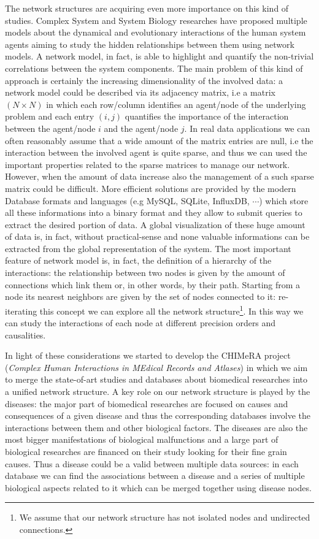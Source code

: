 \documentclass{standalone}
\begin{document}
The network structures are acquiring even more importance on this kind of studies.
Complex System and System Biology researches have proposed multiple models about the dynamical and evolutionary interactions of the human system agents aiming to study the hidden relationships between them using network models.
A network model, in fact, is able to highlight and quantify the non-trivial correlations between the system components.
The main problem of this kind of approach is certainly the increasing dimensionality of the involved data: a network model could be described via its adjacency matrix, i.e a matrix $(N\times N)$ in which each row/column identifies an agent/node of the underlying problem and each entry $(i, j)$ quantifies the importance of the interaction between the agent/node $i$ and the agent/node $j$.
In real data applications we can often reasonably assume that a wide amount of the matrix entries are null, i.e the interaction between the involved agent is quite sparse, and thus we can used the important properties related to the sparse matrices to manage our network.
However, when the amount of data increase also the management of a such sparse matrix could be difficult.
More efficient solutions are provided by the modern Database formats and languages (e.g MySQL, SQLite, InfluxDB, $\cdots$) which store all these informations into a binary format and they allow to submit queries to extract the desired portion of data.
A global visualization of these huge amount of data is, in fact, without practical-sense and none valuable informations can be extracted from the global representation of the system.
The most important feature of network model is, in fact, the definition of a hierarchy of the interactions: the relationship between two nodes is given by the amount of connections which link them or, in other words, by their path.
Starting from a node its nearest neighbors are given by the set of nodes connected to it: re-iterating this concept we can explore all the network structure\footnote{
  We assume that our network structure has not isolated nodes and undirected connections.
}.
In this way we can study the interactions of each node at different precision orders and causalities.

In light of these considerations we started to develop the CHIMeRA project (\emph{Complex Human Interactions in MEdical Records and Atlases}) in which we aim to merge the state-of-art studies and databases about biomedical researches into a unified network structure.
A key role on our network structure is played by the diseases: the major part of biomedical researches are focused on causes and consequences of a given disease and thus the corresponding databases involve the interactions between them and other biological factors.
The diseases are also the most bigger manifestations of biological malfunctions and a large part of biological researches are financed on their study looking for their fine grain causes.
Thus a disease could be a valid  between multiple data sources: in each database we can find the associations between a disease and a series of multiple biological aspects related to it which can be merged together using disease nodes.
\end{document}
